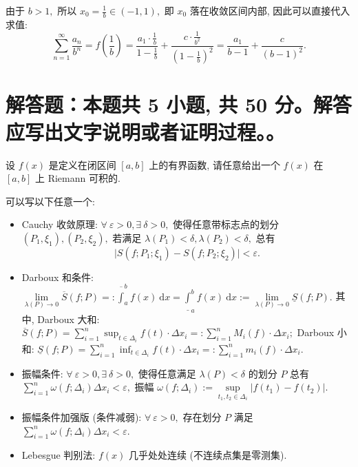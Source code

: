\begin{solution}
由于 $b > 1,$ 所以 $x_0 = \frac{1}{b} \in (-1, 1),$ 即 $x_0$ 落在收敛区间内部, 因此可以直接代入求值:
\[
\sum_{n=1}^\infty \frac{a_n}{b^n} = f\left( \frac{1}{b} \right) = \frac{a_1 \cdot \frac{1}{b}}{1 - \frac{1}{b}} + \frac{c \cdot \frac{1}{b^2}}{\left( 1 - \frac{1}{b} \right)^2} = \frac{a_1}{b-1} + \frac{c}{(b-1)^2}.
\]
\end{solution}


\section{解答题：本题共 5 小题, 共 50 分。解答应写出文字说明或者证明过程。。}


\begin{question}[points = 8]
设 $f(x)$ 是定义在闭区间 $[a, b]$ 上的有界函数, 请任意给出一个 $f(x)$ 在 $[a, b]$ 上 Riemann 可积的.

\end{question}

\begin{solution}
可以写以下任意一个:
\begin{itemize}
\item Cauchy 收敛原理: $\forall ~ \varepsilon > 0, \exists ~ \delta > 0,$ 使得任意带标志点的划分 $(P_1, \xi_1), (P_2, \xi_2),$ 若满足 $\lambda(P_1) < \delta, \lambda(P_2) < \delta,$ 总有
\[\lvert S(f; P_1; \xi_1) - S(f; P_2; \xi_2) \rvert < \varepsilon.\]
\item Darboux 和条件: $\lim\limits_{\lambda(P) \to 0} \overline{S}(f; P) =: \overline{\int}_a^b f(x) ~ \mathrm{d} x = \underline{\int}_a^b f(x) ~ \mathrm{d} x := \lim\limits_{\lambda(P) \to 0} \underline{S}(f; P).$ 其中, Darboux 大和: $\overline{S}(f; P) = \sum\limits_{i=1}^n \sup_{t\in\Delta_i} f(t) \cdot \Delta x_i =: \sum\limits_{i=1}^n M_i(f) \cdot \Delta x_i;$ Darboux 小和: $\underline{S}(f; P) = \sum\limits_{i=1}^n \inf_{t\in\Delta_i} f(t) \cdot \Delta x_i =: \sum\limits_{i=1}^n m_i(f) \cdot \Delta x_i.$
\item 振幅条件: $\forall ~ \varepsilon > 0, \exists ~ \delta > 0,$ 使得任意满足 $\lambda(P) < \delta$ 的划分 $P$ 总有
$\sum\limits_{i=1}^n \omega(f; \Delta_i) \Delta x_i < \varepsilon,$ 振幅 $\omega(f; \Delta_i) := \sup\limits_{t_1, t_2 \in \Delta_i} \lvert f(t_1) - f(t_2) \rvert.$
\item 振幅条件加强版 (条件减弱): $\forall ~ \varepsilon > 0,$ 存在划分 $P$ 满足
$\sum\limits_{i=1}^n \omega(f; \Delta_i) \Delta x_i < \varepsilon.$
\item Lebesgue 判别法: $f(x)$ 几乎处处连续 (不连续点集是零测集).
\end{itemize}
\end{solution}


